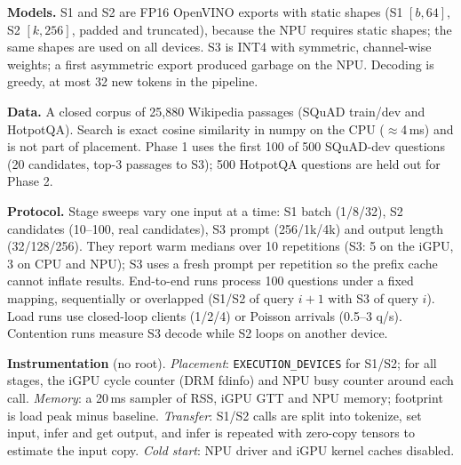 \documentclass[10pt]{article}
\begin{document}
\textbf{Models.} S1 and S2 are FP16 OpenVINO exports with static shapes (S1 $[b,64]$, S2 $[k,256]$, padded and truncated), because the NPU requires static shapes; the same shapes are used on all devices. S3 is INT4 with symmetric, channel-wise weights; a first asymmetric export produced garbage on the NPU. Decoding is greedy, at most 32 new tokens in the pipeline.

\textbf{Data.} A closed corpus of 25,880 Wikipedia passages (SQuAD train/dev and HotpotQA). Search is exact cosine similarity in numpy on the CPU ($\approx$4\,ms) and is not part of placement. Phase 1 uses the first 100 of 500 SQuAD-dev questions (20 candidates, top-3 passages to S3); 500 HotpotQA questions are held out for Phase 2.

\textbf{Protocol.} Stage sweeps vary one input at a time: S1 batch (1/8/32), S2 candidates (10--100, real candidates), S3 prompt (256/1k/4k) and output length (32/128/256). They report warm medians over 10 repetitions (S3: 5 on the iGPU, 3 on CPU and NPU); S3 uses a fresh prompt per repetition so the prefix cache cannot inflate results. End-to-end runs process 100 questions under a fixed mapping, sequentially or overlapped (S1/S2 of query $i{+}1$ with S3 of query $i$). Load runs use closed-loop clients (1/2/4) or Poisson arrivals (0.5--3 q/s). Contention runs measure S3 decode while S2 loops on another device.

\textbf{Instrumentation} (no root). \emph{Placement}: \texttt{EXECUTION\_DEVICES} for S1/S2; for all stages, the iGPU cycle counter (DRM fdinfo) and NPU busy counter around each call. \emph{Memory}: a 20\,ms sampler of RSS, iGPU GTT and NPU memory; footprint is load peak minus baseline. \emph{Transfer}: S1/S2 calls are split into tokenize, set input, infer and get output, and infer is repeated with zero-copy tensors to estimate the input copy. \emph{Cold start}: NPU driver and iGPU kernel caches disabled.
\end{document}
